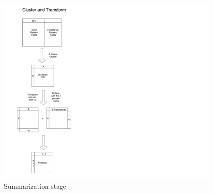 

\begin{figure}[ht]
\vskip 0.2in
\begin{center}
\centerline{\includegraphics[width=\columnwidth]{images/cluster_and_transform_vertical}}
\caption{Summarization stage}
\end{center}
\vskip -0.2in
\end{figure} 